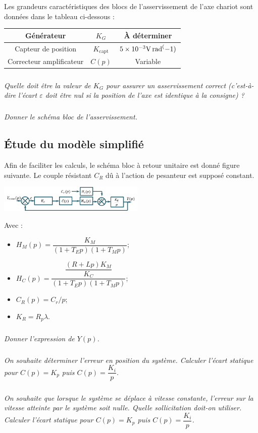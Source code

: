 \documentclass[10pt,fleqn]{article} %
\begin{document}
\begin{multicols}{2}
Les grandeurs caractéristiques des blocs de l'asservissement de l'axe chariot sont données dans le tableau ci-dessous :
\begin{center}
\begin{tabular}{|c|c|c|}
\hline
Générateur & $K_G$ & À déterminer \\
\hline
Capteur de position	& $K_\text{capt}$ & $\num{5d-3}\si{V.rad^(-1)}$ \\
\hline
Correcteur amplificateur	 & $C(p)$ & Variable \\
\hline
\end{tabular}
\end{center}

\subparagraph{}
\textit{Quelle doit être la valeur de $K_G$ pour assurer un asservissement correct (c'est-à-dire l'écart $\varepsilon$ doit être nul si la position de l'axe est identique à la consigne) ?}

\subparagraph{}
\textit{Donner le schéma bloc de l'asservissement.}

\subsection*{Étude du modèle simplifié}
Afin de faciliter les calculs, le schéma bloc à retour unitaire est donné figure suivante. Le couple résistant $C_R$ dû à l'action de pesanteur est supposé constant.
 
 \begin{center}
\includegraphics[width=7cm]{images/image10}
\end{center} 


Avec :
\begin{itemize}
\item $H_M (p)=\dfrac{K_M}{(1+T_E p)(1+T_M p)}$;
\item $H_C (p)=\dfrac{\dfrac{\left(R+Lp\right)K_M}{K_C}}{(1+T_E p)(1+T_M p)}$;
\item $C_R (p)=C_r/p$;
\item $K_R=R_p \lambda$.
\end{itemize}
\subparagraph{}
\textit{Donner l'expression de $Y(p)$.}

\subparagraph{}
\textit{On souhaite déterminer l'erreur en position du système. Calculer l'écart statique pour $C(p)=K_p$ puis $C(p)=\dfrac{K_i}{p}$.}

\subparagraph{}
\textit{On souhaite que lorsque le système se déplace à vitesse constante, l'erreur sur la vitesse atteinte par le système soit nulle. Quelle sollicitation doit-on utiliser. Calculer l'écart statique pour $C(p)=K_p$ puis $C(p)=\dfrac{K_i}{p}$.}


\end{multicols}
\end{document}
